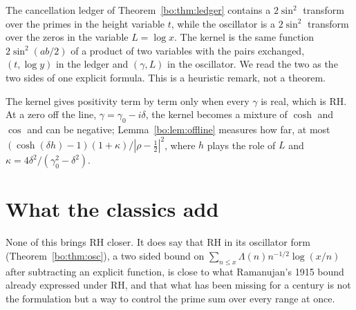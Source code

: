 The cancellation ledger of Theorem~\ref{bo:thm:ledger} contains a $2\sin^2$ transform over the primes in the height variable $t$, while the oscillator is a $2\sin^2$ transform over the zeros in the variable $L=\log x$. The kernel is the same function $2\sin^2(ab/2)$ of a product of two variables with the pairs exchanged, $(t,\log y)$ in the ledger and $(\gamma,L)$ in the oscillator. We read the two as the two sides of one explicit formula. This is a heuristic remark, not a theorem.

The kernel gives positivity term by term only when every $\gamma$ is real, which is RH. At a zero off the line, $\gamma=\gamma_0-i\delta$, the kernel becomes a mixture of $\cosh$ and $\cos$ and can be negative; Lemma~\ref{bo:lem:offline} measures how far, at most $(\cosh(\delta h)-1)(1+\kappa)/|\rho-\frac12|^2$, where $h$ plays the role of $L$ and $\kappa=4\delta^2/(\gamma_0^2-\delta^2)$.

\section{What the classics add}\label{cl:sec:add}

None of this brings RH closer. It does say that RH in its oscillator form (Theorem~\ref{bo:thm:osc}), a two sided bound on $\sum_{n\le x}\Lambda(n)n^{-1/2}\log(x/n)$ after subtracting an explicit function, is close to what Ramanujan's 1915 bound already expressed under RH, and that what has been missing for a century is not the formulation but a way to control the prime sum over every range at once.
